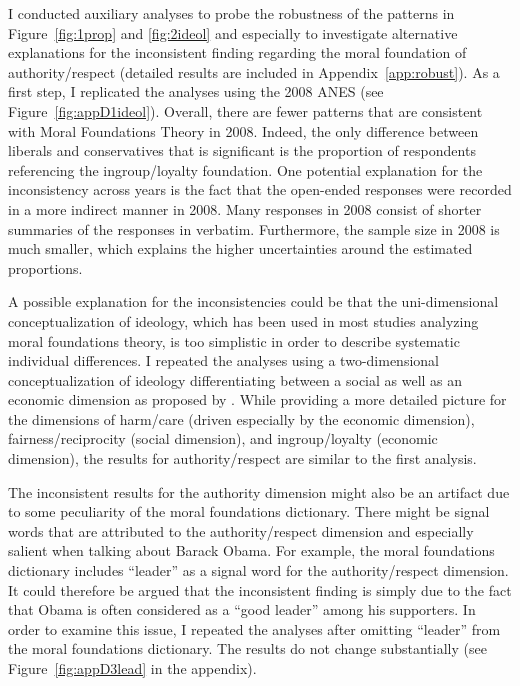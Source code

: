 \documentclass[12pt]{article}
\begin{document}
I conducted auxiliary analyses to probe the robustness of the patterns in Figure~\ref{fig:1prop} and \ref{fig:2ideol} and especially to investigate alternative explanations for the inconsistent finding regarding the moral foundation of authority/respect (detailed results are included in Appendix~\ref{app:robust}). As a first step, I replicated the analyses using the 2008 ANES (see Figure~\ref{fig:appD1ideol}). Overall, there are fewer patterns that are consistent with Moral Foundations Theory in 2008. Indeed, the only difference between liberals and conservatives that is significant is the proportion of respondents referencing the ingroup/loyalty foundation. One potential explanation for the inconsistency across years is the fact that the open-ended responses were recorded in a more indirect manner in 2008. Many responses in 2008 consist of shorter summaries of the responses in verbatim. Furthermore, the sample size in 2008 is much smaller, which explains the higher uncertainties around the estimated proportions.

A possible explanation for the inconsistencies could be that the uni-dimensional conceptualization of ideology, which has been used in most studies analyzing moral foundations theory, is too simplistic in order to describe systematic individual differences. I repeated the analyses using a two-dimensional conceptualization of ideology differentiating between a social as well as an economic dimension as proposed by \citet[see Figure~\ref{fig:appD2soceco}]{feldman2014understanding}. While providing a more detailed picture for the dimensions of harm/care (driven especially by the economic dimension), fairness/reciprocity (social dimension), and ingroup/loyalty (economic dimension), the results for authority/respect are similar to the first analysis.

The inconsistent results for the authority dimension might also be an artifact due to some peculiarity of the moral foundations dictionary. There might be signal words that are attributed to the authority/respect dimension and especially salient when talking about Barack Obama. For example, the moral foundations dictionary includes ``leader'' as a signal word for the authority/respect dimension. It could therefore be argued that the inconsistent finding is simply due to the fact that Obama is often considered as a ``good leader'' among his supporters. In order to examine this issue, I repeated the analyses after omitting ``leader'' from the moral foundations dictionary. The results do not change substantially (see Figure~\ref{fig:appD3lead} in the appendix).
\end{document}

